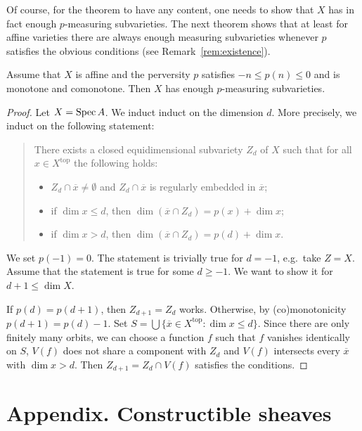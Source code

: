 \documentclass[english,biblatex-alpha]{short-notes}
\begin{document}
Of course, for the theorem to have any content, one needs to show that $X$ has in fact enough $p$-measuring subvarieties.
The next theorem shows that at least for affine varieties there are always enough measuring subvarieties whenever $p$ satisfies the obvious conditions (see Remark~\ref{rem:existence}).

\begin{Thm}
    \label{thm:existance}%
    Assume that $X$ is affine and the perversity $p$ satisfies $-n \le p(n) \le 0$ and is monotone and comonotone.
    Then $X$ has enough $p$-measuring subvarieties.
\end{Thm}

\begin{proof}
    Let $X = \operatorname{Spec} A$.
    We induct induct on the dimension $d$.
    More precisely, we induct on the following statement:
    \begin{quote}
        There exists a closed equidimensional subvariety $Z_d$ of $X$ such that for all $x ∈ X^{\mathrm{top}}$ the following holds:
        \begin{itemize}
            \item $Z_d \cap \overline x \ne \emptyset$ and $Z_d \cap \overline x$ is regularly embedded in $\overline x$;
            \item if $\dim x \le d$, then $\dim(\overline x ∩ Z_d) = p(x) + \dim x$;
            \item if $\dim x > d$, then $\dim(\overline x ∩ Z_d) = p(d) + \dim x$.
        \end{itemize}
    \end{quote}
    We set $p(-1) = 0$.
    The statement is trivially true for $d = -1$, e.g.~take $Z = X$.
    Assume that the statement is true for some $d \ge -1$.
    We want to show it for $d+1 \le \dim X$.

    If $p(d) = p(d+1)$, then $Z_{d+1} = Z_{d}$ works.
    Otherwise, by (co)monotonicity $p(d+1) = p(d) - 1$.
    Set $S = \bigcup \{ \overline x ∈ X^{\mathrm{top}} : \dim x \le d\}$.
    Since there are only finitely many orbits, we can choose a function $f$  such that $f$ vanishes identically on $S$, $V(f)$ does not share a component with $Z_d$ and $V(f)$ intersects every $\overline x$ with $\dim x > d$.
    Then $Z_{d+1} = Z_d \cap V(f)$ satisfies the conditions.
\end{proof}

\appendix

\section*{Appendix. Constructible sheaves}
\end{document}
